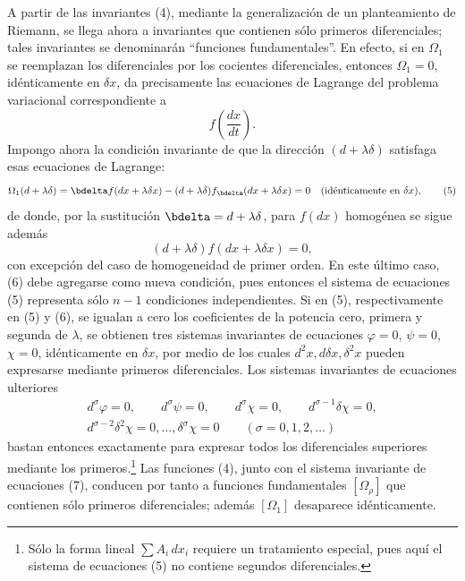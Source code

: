 A partir de las invariantes (4), mediante la generalización de un planteamiento
de Riemann, se llega ahora a invariantes que contienen sólo primeros
diferenciales; tales invariantes se denominarán ``funciones fundamentales''. En
efecto, si en \(\Omega_1\) se reemplazan los diferenciales por los cocientes
diferenciales, entonces \(\Omega_1=0\), idénticamente en \(\delta x\), da
precisamente las ecuaciones de Lagrange del problema variacional correspondiente
a
\[
f\!\left(\frac{dx}{dt}\right).
\]
Impongo ahora la condición invariante de que la dirección \((d+\lambda\delta)\)
satisfaga esas ecuaciones de Lagrange:
\begin{equation}
\Omega_1(d+\lambda\delta)=
\bdelta f(dx+\lambda\delta x)
-(d+\lambda\delta)f_{\bdelta}(dx+\lambda\delta x)=0
\quad(\text{idénticamente en }\delta x),
\tag{5}
\end{equation}
de donde, por la sustitución \(\bdelta=d+\lambda\delta\), para \(f(dx)\)
homogénea se sigue además
\begin{equation}
(d+\lambda\delta)f(dx+\lambda\delta x)=0,
\tag{6}
\end{equation}
con excepción del caso de homogeneidad de primer orden. En este último caso,
(6) debe agregarse como nueva condición, pues entonces el sistema de ecuaciones
(5) representa sólo \(n-1\) condiciones independientes. Si en (5),
respectivamente en (5) y (6), se igualan a cero los coeficientes de la potencia
cero, primera y segunda de \(\lambda\), se obtienen tres sistemas invariantes de
ecuaciones \(\varphi=0\), \(\psi=0\), \(\chi=0\), idénticamente en \(\delta x\),
por medio de los cuales \(d^2x,d\delta x,\delta^2x\) pueden expresarse mediante
primeros diferenciales. Los sistemas invariantes de ecuaciones ulteriores
\begin{equation}
\begin{gathered}
d^\sigma\varphi=0,\qquad d^\sigma\psi=0,\qquad
d^\sigma\chi=0,\qquad d^{\sigma-1}\delta\chi=0,\\
d^{\sigma-2}\delta^2\chi=0,\ldots,\delta^\sigma\chi=0
\qquad(\sigma=0,1,2,\ldots)
\end{gathered}
\tag{7}
\end{equation}
bastan entonces exactamente para expresar todos los diferenciales superiores
mediante los primeros.\footnote{Sólo la forma lineal \(\sum A_i\,dx_i\) requiere
un tratamiento especial, pues aquí el sistema de ecuaciones (5) no contiene
segundos diferenciales.} Las funciones (4), junto con el sistema invariante de
ecuaciones (7), conducen por tanto a funciones fundamentales \([\Omega_\rho]\)
que contienen sólo primeros diferenciales; además \([\Omega_1]\) desaparece
idénticamente.

